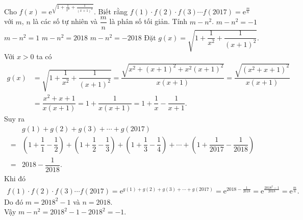 \begin{ex}%
 Cho $f(x) = \mathrm{e}^{\sqrt{1 + \frac{1}{x^2} + \frac{1}{(x + 1)^2}}}$. Biết rằng $f(1) \cdot f(2) \cdot f(3) \cdots f(2017) = \mathrm{e}^{\frac{m}{n}}$ với $m$, $n$ là các số tự nhiên và $\dfrac{m}{n}$ là phân số tối giản. Tính $m - n^2$.
 \choice
  {\True $m - n^2 = -1$}
  {$m - n^2 = 1$}
  {$m - n^2 = 2018$}
  {$m - n^2 = -2018$}
 \loigiai
  {
  Đặt $g(x) = \sqrt{1 + \dfrac{1}{x^2} + \dfrac{1}{(x + 1)^2}}$.\\
  Với $x > 0$ ta có
  \begin{align*}
   g(x) & = \sqrt{1 + \dfrac{1}{x^2} + \dfrac{1}{(x + 1)^2}} = \dfrac{\sqrt{x^2 + (x+1)^2 + x^2 (x+1)^2}}{x(x+1)} = \dfrac{\sqrt{\left( x^2 + x + 1 \right)^2}}{x(x+1)} \\
        & = \dfrac{x^2 + x + 1}{x(x + 1)} = 1 + \dfrac{1}{x(x + 1)} = 1 + \dfrac{1}{x} - \dfrac{1}{x + 1}.
  \end{align*}
  Suy ra
  \begin{align*}
     & g(1) + g(2) + g(3) + \cdots + g(2017) \\
   = & \left(1 + \dfrac{1}{1} - \dfrac{1}{2} \right) + \left( 1 + \dfrac{1}{2} - \dfrac{1}{3} \right) + \left( 1 + \dfrac{1}{3} - \dfrac{1}{4} \right) + \cdots + \left( 1 + \dfrac{1}{2017} - \dfrac{1}{2018} \right) \\
   = & 2018 - \dfrac{1}{2018}.
  \end{align*}
  Khi đó
  \begin{align*}
   f(1) \cdot f(2) \cdot f(3) \cdots f(2017) = \mathrm{e}^{g(1) + g(2) + g(3) + \cdots + g(2017)} = \mathrm{e}^{2018 - \frac{1}{2018}} = \mathrm{e}^{\frac{2018^2 - 1}{2018}} = \mathrm{e}^{\frac{m}{n}}.
  \end{align*}
  Do đó $m = 2018^2 - 1$ và $n = 2018$.\\
  Vậy $m - n^2 = 2018^2 - 1 - 2018^2 = -1$.
  }
\end{ex}


